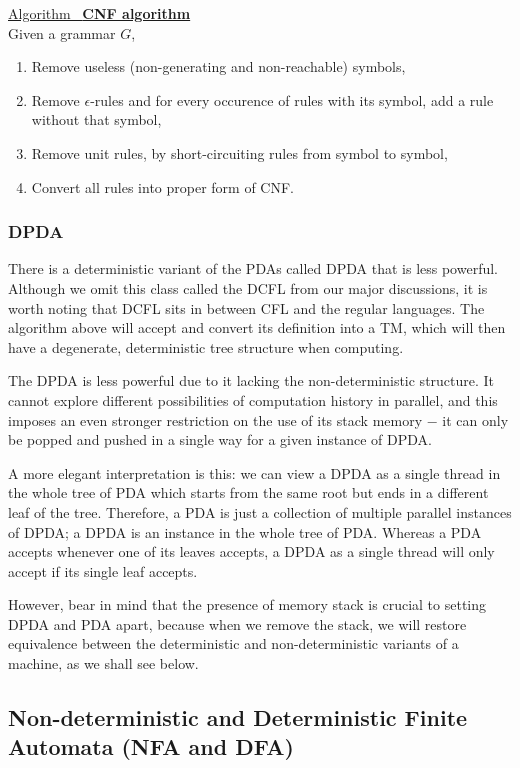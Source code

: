 \documentclass[12pt]{article}  %
\newcommand{\algtitle}[1]{\underline{Algorithm \ {\bf #1}} \vspace*{1mm}\\}
\begin{document}
\algtitle{CNF algorithm}
Given a grammar $G$,
\begin{enumerate}
	\item Remove useless (non-generating and non-reachable) symbols,
	\item Remove $\epsilon$-rules and for every occurence of rules with its symbol, add a rule without that symbol,
	\item Remove unit rules, by short-circuiting rules from symbol to symbol,
	\item Convert all rules into proper form of CNF.
\end{enumerate}

\subsubsection{DPDA}

There is a deterministic variant of the PDAs called DPDA that is less powerful. Although we omit this class called the DCFL from our major discussions, it is worth noting that DCFL sits in between CFL and the regular languages. The algorithm above will accept and convert its definition into a TM, which will then have a degenerate, deterministic tree structure when computing.

The DPDA is less powerful due to it lacking the non-deterministic structure. It cannot explore different possibilities of computation history in parallel, and this imposes an even stronger restriction on the use of its stack memory $-$ it can only be popped and pushed in a single way for a given instance of DPDA. 

A more elegant interpretation is this: we can view a DPDA as a single thread in the whole tree of PDA which starts from the same root but ends in a different leaf of the tree. Therefore, a PDA is just a collection of multiple parallel instances of DPDA; a DPDA is an instance in the whole tree of PDA. Whereas a PDA accepts whenever one of its leaves accepts, a DPDA as a single thread will only accept if its single leaf accepts. 

However, bear in mind that the presence of memory stack is crucial to setting DPDA and PDA apart, because when we remove the stack, we will restore equivalence between the deterministic and non-deterministic variants of a machine, as we shall see below.



\subsection{Non-deterministic and Deterministic Finite Automata (NFA and DFA)}
\end{document}
